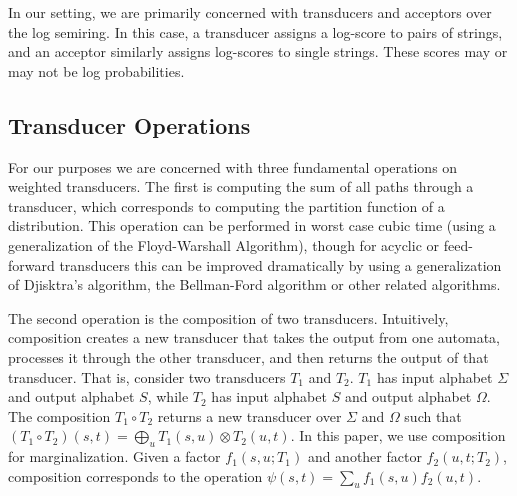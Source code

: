 \documentclass[11pt,a4paper]{article}
\begin{document}

In our setting, we are primarily concerned with transducers and
acceptors over the log semiring. In this case, a transducer assigns
a log-score to pairs of strings, and an acceptor similarly assigns
log-scores to single strings. These scores may or may not be
log probabilities.

\subsection{Transducer Operations}

For our purposes we are concerned with three fundamental operations
on weighted transducers. The first is computing the sum of all paths through a
transducer, which corresponds to computing the partition function
of a distribution. This operation can be performed in worst case
cubic time (using a generalization of the Floyd-Warshall Algorithm),
though for acyclic or feed-forward transducers this can be improved
dramatically by using a generalization of Djisktra's algorithm, the
Bellman-Ford algorithm or other related algorithms.

The second operation is the composition of two transducers. Intuitively,
composition creates a new transducer that takes the output from one
automata, processes it through the other transducer, and then returns
the output of that transducer. That is, consider two transducers
$T_1$ and $T_2$. $T_1$ has input alphabet $\Sigma$ and output
alphabet $S$, while $T_2$ has input alphabet $S$ and
output alphabet $\Omega$. The composition $T_1 \circ T_2$ returns
a new transducer over $\Sigma$ and $\Omega$ such that $(T_1 \circ
T_2)(s,t) = \bigoplus_{u} T_1(s,u)\otimes T_2(u,t)$. In this paper,
we use composition for marginalization. Given a factor $f_1(s,u;T_1)$
and another factor $f_2(u,t;T_2)$, composition corresponds to the
operation $\psi(s,t) = \sum_u f_1(s,u) f_2(u,t)$.
\end{document}
